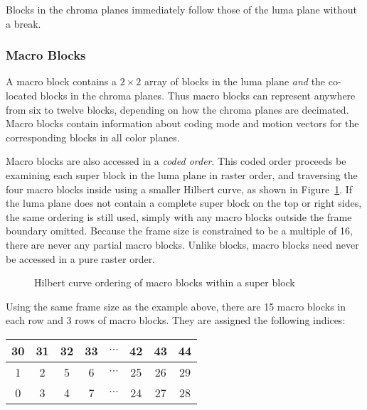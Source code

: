 \documentclass[11pt,letterpaper]{article}
\newcommand{\term}[1]{{\em #1}}
\begin{document}
Blocks in the chroma planes immediately follow those of the luma plane without
 a break.

\subsubsection{Macro Blocks}

A macro block contains a $2\times 2$ array of blocks in the luma plane
 {\em and} the co-located blocks in the chroma planes.
Thus macro blocks can represent anywhere from six to twelve blocks, depending
 on how the chroma planes are decimated.
Macro blocks contain information about coding mode and motion vectors for the
 corresponding blocks in all color planes.

Macro blocks are also accessed in a \term{coded order}.
This coded order proceeds be examining each super block in the luma plane in
 raster order, and traversing the four macro blocks inside using a smaller
 Hilbert curve, as shown in Figure~\ref{fig:hilbert-mb}.
If the luma plane does not contain a complete super block on the top or right
 sides, the same ordering is still used, simply with any macro blocks outside
 the frame boundary omitted.
Because the frame size is constrained to be a multiple of 16, there are never
 any partial macro blocks.
Unlike blocks, macro blocks need never be accessed in a pure raster order.

\begin{figure}[htb]
\begin{center}

\end{center}
\caption{Hilbert curve ordering of macro blocks within a super block}
\label{fig:hilbert-mb}
\end{figure}

Using the same frame size as the example above, there are 15 macro blocks in
 each row and 3 rows of macro blocks.
They are assigned the following indices:

\vspace{\baselineskip}
\begin{center}
\begin{tabular}{|cc|cc|c|cc|c|}\hline
30 & 31 & 32 & 33 & $\cdots$ & 42 & 43 & 44 \\\hline
 1 &  2 &  5 &  6 & $\cdots$ & 25 & 26 & 29 \\
 0 &  3 &  4 &  7 & $\cdots$ & 24 & 27 & 28 \\\hline
\end{tabular}
\end{center}
\vspace{\baselineskip}
\end{document}

